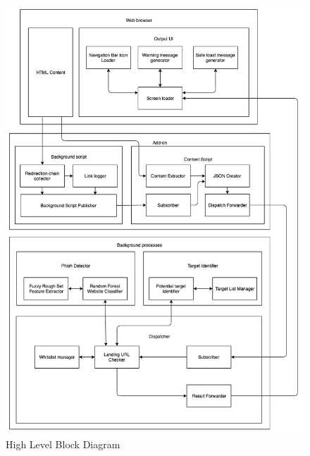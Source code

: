\begin{figure}[h!]
\centering
\includegraphics[scale=0.5]{Figures/image3.png}
\caption{High Level Block Diagram}
\label{fig:block}
\end{figure}

